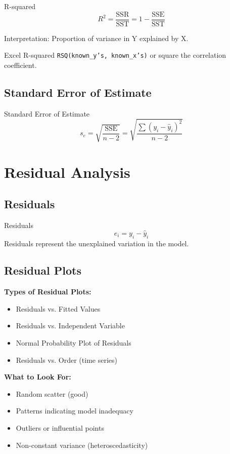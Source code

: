 \documentclass[12pt,a4paper]{book}
\begin{document}
\begin{definition}{R-squared}
\[
R^2 = \frac{\text{SSR}}{\text{SST}} = 1 - \frac{\text{SSE}}{\text{SST}}
\]

Interpretation: Proportion of variance in Y explained by X.
\end{definition}

\begin{example}{Excel R-squared}
\texttt{RSQ(known\_y's, known\_x's)} or square the correlation coefficient.
\end{example}

\subsection{Standard Error of Estimate}

\begin{definition}{Standard Error of Estimate}
\[
s_e = \sqrt{\frac{\text{SSE}}{n-2}} = \sqrt{\frac{\sum(y_i - \hat{y}_i)^2}{n-2}}
\]
\end{definition}

\section{Residual Analysis}

\subsection{Residuals}

\begin{definition}{Residuals}
\[
e_i = y_i - \hat{y}_i
\]
Residuals represent the unexplained variation in the model.
\end{definition}

\subsection{Residual Plots}

\textbf{Types of Residual Plots:}
\begin{itemize}
    \item Residuals vs. Fitted Values
    \item Residuals vs. Independent Variable
    \item Normal Probability Plot of Residuals
    \item Residuals vs. Order (time series)
\end{itemize}

\textbf{What to Look For:}
\begin{itemize}
    \item Random scatter (good)
    \item Patterns indicating model inadequacy
    \item Outliers or influential points
    \item Non-constant variance (heteroscedasticity)
\end{itemize}
\end{document}
